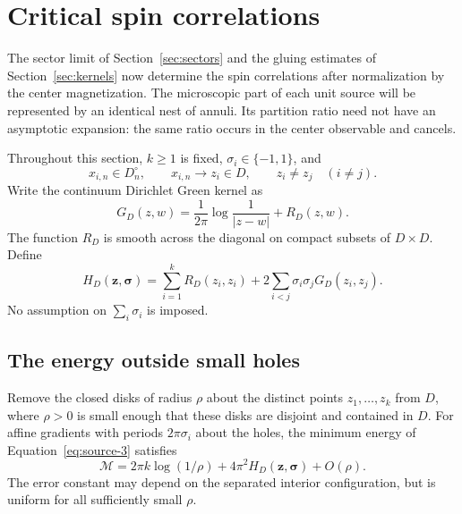 \section{Critical spin correlations}\label{sec:correlations}

The sector limit of Section~\ref{sec:sectors} and the gluing estimates
of Section~\ref{sec:kernels} now determine the spin correlations after
normalization by the center magnetization.  The microscopic part of
each unit source will be represented by an identical nest of annuli.
Its partition ratio need not have an asymptotic expansion: the same
ratio occurs in the center observable and cancels.

Throughout this section, \(k\geq1\) is fixed,
\(\sigma_i\in\{-1,1\}\), and
\[
 x_{i,n}\in D_n^\circ,\qquad x_{i,n}\longrightarrow z_i\in D,
 \qquad z_i\ne z_j\quad(i\ne j).
\]
Write the continuum Dirichlet Green kernel as
\[
 G_D(z,w)=\frac1{2\pi}\log\frac1{|z-w|}+R_D(z,w).
\]
The function \(R_D\) is smooth across the diagonal on compact subsets
of \(D\times D\).  Define
\[
 H_D(\mathbf z,\boldsymbol\sigma)
 =\sum_{i=1}^k R_D(z_i,z_i)
       +2\sum_{i<j}\sigma_i\sigma_jG_D(z_i,z_j).
\]
No assumption on \(\sum_i\sigma_i\) is imposed.

\subsection{The energy outside small holes}

\begin{lemma}\label{correlations:exterior-energy}
Remove the closed disks of radius \(\rho\) about the distinct points
\(z_1,\ldots,z_k\) from \(D\), where \(\rho>0\) is small enough that
these disks are disjoint and contained in \(D\).  For affine gradients
with periods \(2\pi\sigma_i\) about the holes, the minimum energy of
Equation~\eqref{eq:source-3} satisfies
\begin{equation}
 \mathcal M
 =2\pi k\log(1/\rho)
      +4\pi^2H_D(\mathbf z,\boldsymbol\sigma)+O(\rho).
 \tag{12}\label{eq:source-12}
\end{equation}
The error constant may depend on the separated interior configuration,
but is uniform for all sufficiently small \(\rho\).
\end{lemma}

